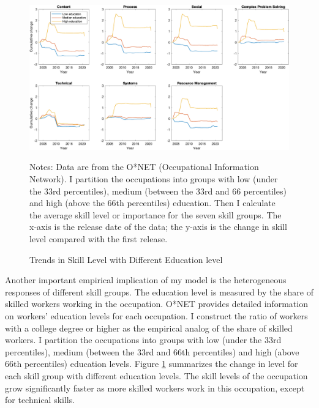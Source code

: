 \documentclass[12pt]{article}
\begin{document}
\begin{appendices}
\begin{figure}[h!]
\includegraphics[width = \textwidth]{LV_trend2}
\caption{Trends in Skill Level with Different Education level}
\label{LV_trend2}
{\scriptsize Notes: Data are from the O*NET (Occupational Information Network). I partition the occupations into groups with low (under the 33rd percentiles), medium (between the 33rd and 66 percentiles) and high (above the 66th percentiles) education. Then I calculate the average skill level or importance for the seven skill groups. The x-axis is the release date of the data; the y-axis is the change in skill level compared with the first release. }
\end{figure}

Another important empirical implication of my model is the heterogeneous responses of different skill groups. The education level is measured by the share of skilled workers working in the occupation. O*NET provides detailed information on workers' education levels for each occupation. I construct the ratio of workers with a college degree or higher as the empirical analog of the share of skilled workers. I partition the occupations into groups with low (under the 33rd percentiles), medium (between the 33rd and 66th percentiles) and high (above 66th percentiles) education levels. Figure \ref{LV_trend2} summarizes the change in level for each skill group with different education levels. The skill levels of the occupation grow significantly faster as more skilled workers work in this occupation, except for technical skills. 


\end{appendices}
\end{document}
